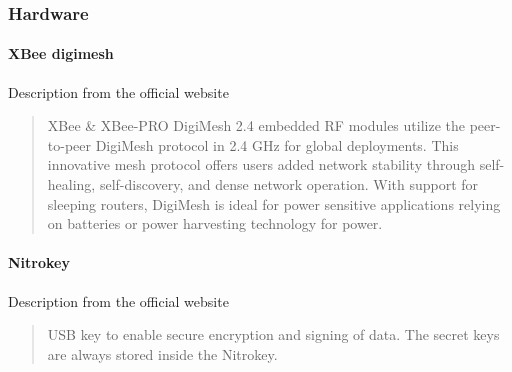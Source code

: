 
\subsubsection{Hardware}

\paragraph{XBee digimesh}
Description from the official website \cite{XBeeDigimesh}
\blockquote{XBee \& XBee-PRO DigiMesh 2.4 embedded RF modules utilize the peer-to-peer DigiMesh protocol in 2.4 GHz for global deployments. This innovative mesh protocol offers users added network stability through self-healing, self-discovery, and dense network operation. With support for sleeping routers, DigiMesh is ideal for power sensitive applications relying on batteries or power harvesting technology for power.}

\paragraph{Nitrokey}
Description from the official website \cite{NitrokeyNitokey}
\blockquote{USB key to enable secure encryption and signing of data. The secret keys are always stored inside the Nitrokey.}



